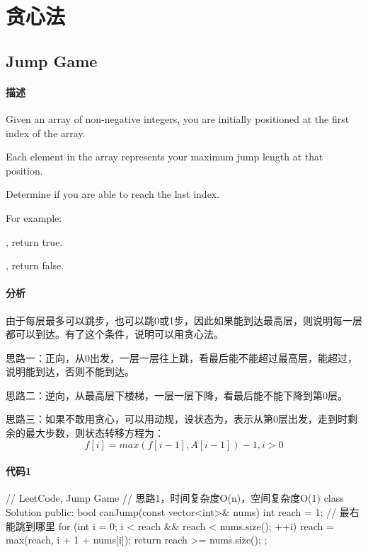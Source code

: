 \chapter{贪心法}


\section{Jump Game} %
\label{sec:jump-game}


\subsubsection{描述}
Given an array of non-negative integers, you are initially positioned at the first index of the array.

Each element in the array represents your maximum jump length at that position.

Determine if you are able to reach the last index.

For example:

, return true.

, return false.


\subsubsection{分析}
由于每层最多可以跳步，也可以跳0或1步，因此如果能到达最高层，则说明每一层都可以到达。有了这个条件，说明可以用贪心法。

思路一：正向，从0出发，一层一层往上跳，看最后能不能超过最高层，能超过，说明能到达，否则不能到达。

思路二：逆向，从最高层下楼梯，一层一层下降，看最后能不能下降到第0层。

思路三：如果不敢用贪心，可以用动规，设状态为，表示从第0层出发，走到时剩余的最大步数，则状态转移方程为：
$$
f[i] = max(f[i-1], A[i-1])-1, i > 0
$$


\subsubsection{代码1}
\begin{Code}
// LeetCode, Jump Game
// 思路1，时间复杂度O(n)，空间复杂度O(1)
class Solution {
public:
    bool canJump(const vector<int>& nums) {
        int reach = 1; // 最右能跳到哪里
        for (int i = 0; i < reach && reach < nums.size(); ++i)
            reach = max(reach,  i + 1 + nums[i]);
        return reach >= nums.size();
    }
};
\end{Code}


